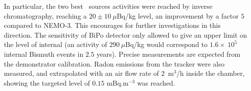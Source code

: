 In particular, the two best \Tl\ sources activities were reached by inverse chromatography, reaching a $20\pm10~\mu$Bq/kg level, an improvement by a factor $5$ compared to NEMO-$3$.
This encourages for further investigations in this direction.
The sensitivity of BiPo detector only allowed to give an upper limit on the level of internal \Bi(an activity of $290~\mu$Bq/kg would correspond to $1.6\times~10^{5}$ internal Bismuth events in $2.5$ years).
Precise measurements are expected from the demonstrator calibration.
Radon emissions from the tracker were also measured, and extrapolated with an air flow rate of $2$~m$^{3}$/h inside the chamber, showing the targeted level of $0.15$ mBq.m$^{-3}$ was reached.


